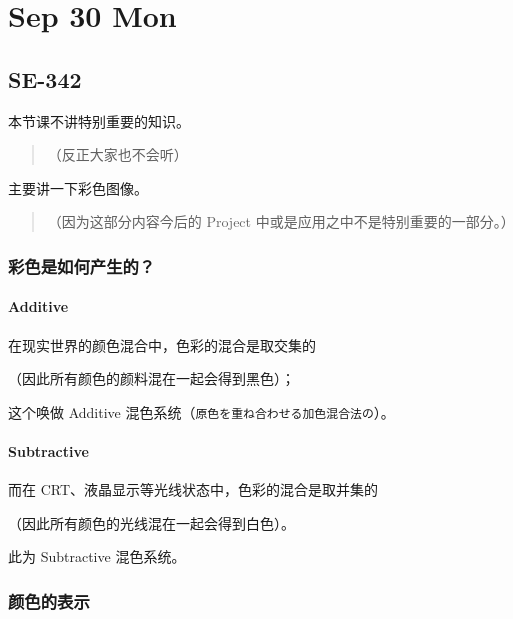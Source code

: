 \documentclass[
]{article}
\date{}
\begin{document}
\hypertarget{header-n0}{%
\section{Sep 30 Mon}\label{header-n0}}

\hypertarget{header-n2}{%
\subsection{SE-342}\label{header-n2}}

本节课不讲特别重要的知识。

\begin{quote}
（反正大家也不会听）
\end{quote}

主要讲一下彩色图像。

\begin{quote}
（因为这部分内容今后的 Project 中或是应用之中不是特别重要的一部分。）
\end{quote}

\hypertarget{header-n9}{%
\subsubsection{彩色是如何产生的？}\label{header-n9}}

\hypertarget{header-n10}{%
\paragraph{Additive}\label{header-n10}}

在现实世界的颜色混合中，色彩的混合是取交集的

（因此所有颜色的颜料混在一起会得到黑色）；

这个唤做 Additive 混色系统（\texttt{原色を重ね合わせる加色混合法の}）。

\hypertarget{header-n14}{%
\paragraph{Subtractive}\label{header-n14}}

而在 CRT、液晶显示等光线状态中，色彩的混合是取并集的

（因此所有颜色的光线混在一起会得到白色）。

此为 Subtractive 混色系统。

\hypertarget{header-n18}{%
\subsubsection{颜色的表示}\label{header-n18}}
\end{document}

